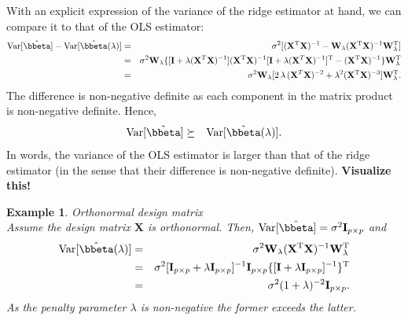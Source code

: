 \documentclass[a4paper]{article}
\theoremstyle{myexamplestyle}
\newtheorem{example}{Example}
\def\reminder#1{\marginpar{\rule[0pt]{1mm}{11pt}}\textbf{#1}}
\begin{document}
With an explicit expression of the variance of the ridge estimator at hand, we can compare it to that of the OLS estimator:
\begin{eqnarray*}
\mbox{Var}[ \hat{\bbeta} ] - \mbox{Var}[ \hat{\bbeta}(\lambda) ] & = & \sigma^2 [(\mathbf{X}^{\mathrm{T}} \mathbf{X})^{-1} - \mathbf{W}_{\lambda}  (\mathbf{X}^{\mathrm{T}} \mathbf{X})^{-1}  \mathbf{W}_{\lambda}^{\mathrm{T}} ]
\\
& = & \sigma^2 \mathbf{W}_{\lambda}  \{ [\mathbf{I} + \lambda (\mathbf{X}^T \mathbf{X})^{-1} ] (\mathbf{X}^{\mathrm{T}} \mathbf{X})^{-1}  [\mathbf{I} + \lambda (\mathbf{X}^T \mathbf{X})^{-1} ]^{\mathrm{T}} - (\mathbf{X}^{\mathrm{T}} \mathbf{X})^{-1} \} \mathbf{W}_{\lambda}^{\mathrm{T}}
\\
& = & \sigma^2 \mathbf{W}_{\lambda}   [ 2 \, \lambda \, (\mathbf{X}^T \mathbf{X})^{-2} + \lambda^2 (\mathbf{X}^{\mathrm{T}} \mathbf{X})^{-3} ] \mathbf{W}_{\lambda}^{\mathrm{T}}.
\end{eqnarray*}
The difference is non-negative definite as each component in the matrix product is non-negative definite. Hence, 
\begin{eqnarray*}
\mbox{Var}[ \hat{\bbeta} ] & \succeq & \mbox{Var}[ \hat{\bbeta}(\lambda) ].
\end{eqnarray*}
In words, the variance of the OLS estimator is larger than that of the ridge estimator (in the sense that their difference is non-negative definite). \reminder{Visualize this!}

\begin{example} \textit{Orthonormal design matrix}
\\
Assume the design matrix $\mathbf{X}$ is orthonormal. Then, $\mbox{Var}[ \hat{\bbeta} ] = \sigma^2 \mathbf{I}_{p \times p}$ and
\begin{eqnarray*}
\mbox{Var}[ \hat{\bbeta}(\lambda) ] & = & \sigma^2 \mathbf{W}_{\lambda}  (\mathbf{X}^{\mathrm{T}} \mathbf{X})^{-1}  \mathbf{W}_{\lambda}^{\mathrm{T}}
\\
& = & \sigma^2 [\mathbf{I}_{p \times p} + \lambda \mathbf{I}_{p \times p} ]^{-1}   \mathbf{I}_{p \times p} \{ [\mathbf{I} + \lambda \mathbf{I}_{p \times p} ]^{-1} \}^{\mathrm{T}}
\\
& = & \sigma^2 (1 + \lambda )^{-2}   \mathbf{I}_{p \times p} .
\end{eqnarray*}
As the penalty parameter $\lambda$ is non-negative the former exceeds the latter.
\end{example}
\end{document}
